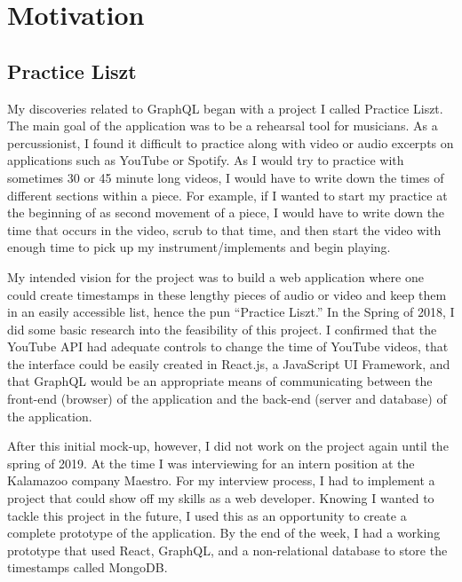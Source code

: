 \section{Motivation} \label{sec:motivation}

\subsection{Practice Liszt}
My discoveries related to GraphQL began with a project I called Practice Liszt.  The main goal of the application was to be a rehearsal tool for musicians. As a percussionist, I found it difficult to practice along with video or audio excerpts on applications such as YouTube or Spotify.  As I would try to practice with sometimes 30 or 45 minute long videos, I would have to write down the times of different sections within a piece.  For example, if I wanted to start my practice at the beginning of as second movement of a piece, I would have to write down the time that occurs in the video, scrub to that time, and then start the video with enough time to pick up my instrument/implements and begin playing.

My intended vision for the project was to build a web application where one could create timestamps in these lengthy pieces of audio or video and keep them in an easily accessible list, hence the pun ``Practice Liszt.'' In the Spring of 2018, I did some basic research into the feasibility of this project.  I confirmed that the YouTube API had adequate controls to change the time of YouTube videos, that the interface could be easily created in React.js, a JavaScript UI Framework, and that GraphQL would be an appropriate means of communicating between the front-end (browser) of the application and the back-end (server and database) of the application.

After this initial mock-up, however, I did not work on the project again until the spring of 2019.  At the time I was interviewing for an intern position at the Kalamazoo company Maestro.  For my interview process, I had to implement a project that could show off my skills as a web developer.  Knowing I wanted to tackle this project in the future, I used this as an opportunity to create a complete prototype of the application.  By the end of the week, I had a working prototype that used React, GraphQL, and a non-relational database to store the timestamps called MongoDB.

